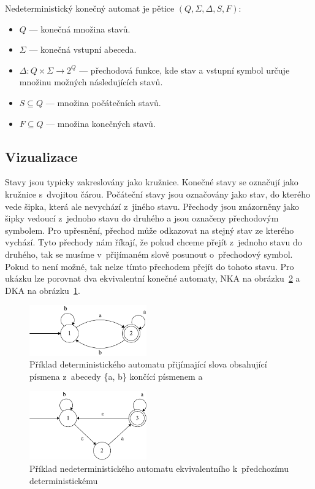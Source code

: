 \noindent Nedeterministický konečný automat je pětice $(Q, \Sigma, \Delta, S, F)$\cite{Viswanathan_2017}:
\begin{itemize}
	\item $Q$ --- konečná množina stavů.
	\item $\Sigma$ --- konečná vstupní abeceda.
	\item $\Delta: Q \times \Sigma \rightarrow 2^Q$ --- přechodová funkce, kde stav a vstupní symbol určuje množinu možných následujících stavů.
	\item $S \subseteq Q$ --- množina počátečních stavů.
	\item $F \subseteq Q$ --- množina konečných stavů.
\end{itemize}

\subsection*{Vizualizace}

Stavy jsou typicky zakreslovány jako kružnice. 
Konečné stavy se označují jako kružnice s~dvojitou čárou. 
Počáteční stavy jsou označovány jako stav, do kterého vede šipka, která ale nevychází z~jiného stavu.
Přechody jsou znázorněny jako šipky vedoucí z~jednoho stavu do druhého a jsou označeny přechodovým symbolem.
Pro upřesnění, přechod může odkazovat na stejný stav ze kterého vychází.
Tyto přechody nám říkají, že pokud chceme přejít z~jednoho stavu do druhého, tak se musíme v~přijímaném slově posunout o~přechodový symbol. 
Pokud to není možné, tak nelze tímto přechodem přejít do tohoto stavu.
Pro ukázku lze porovnat dva ekvivalentní konečné automaty, NKA na obrázku~\ref{fig:NFAex} a DKA na obrázku~\ref{fig:DFAex}.

\begin{figure}[!h]
	\centering
	\includegraphics[width=0.45\textwidth]{Figures/DFA_example.pdf}
	\caption{Příklad deterministického automatu přijímající slova obsahující písmena z~abecedy \{a, b\} končící písmenem a}
	\label{fig:DFAex}
\end{figure}

\begin{figure}[!h]
	\centering
	\includegraphics[width=0.45\textwidth]{Figures/NFA_example.pdf}
	\caption{Příklad nedeterministického automatu ekvivalentního k~předchozímu deterministickému}
	\label{fig:NFAex}
\end{figure}


